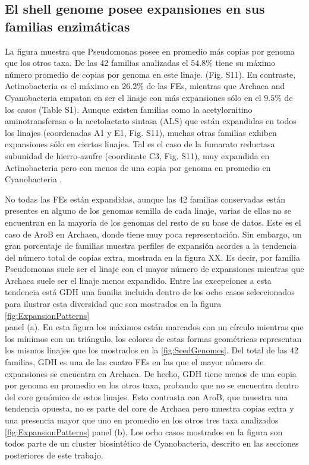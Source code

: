 \documentclass[12pt,twoside]{reedthesis}
\begin{document}
  \subsection{El shell genome posee expansiones en sus familias
  enzimáticas}\label{el-shell-genome-posee-expansiones-en-sus-familias-enzimaticas}
  
  La figura muestra que Pseudomonas posee en promedio más copias por
  genoma que los otros taxa. De las 42 familias analizadas el \(54.8\%\)
  tiene su máximo número promedio de copias por genoma en este linaje.
  (Fig. S11). En contraste, Actinobacteria es el máximo en \(26.2\%\) de
  las FEs, mientras que Archaea and Cyanobacteria empatan en ser el linaje
  con más expansiones sólo en el \(9.5\%\) de los casos (Table S1). Aunque
  existen familias como la acetylornitino aminotransferasa o la
  acetolactato sintasa (ALS) que están expandidas en todos los linajes
  (coordenadas A1 y E1, Fig. S11), muchas otras familias exhiben
  expansiones sólo en ciertos linajes. Tal es el caso de la fumarato
  reductasa subunidad de hierro-azufre (coordinate C3, Fig. S11), muy
  expandida en Actinobacteria pero con menos de una copia por genoma en
  promedio en Cyanobacteria .
  
  No todas las FEs están expandidas, aunque las 42 familias conservadas
  están presentes en alguno de los genomas semilla de cada linaje, varias
  de ellas no se encuentran en la mayoría de los genomas del resto de su
  base de datos. Este es el caso de AroB en Archaea, donde tiene muy poca
  representación. Sin embargo, un gran porcentaje de familias muestra
  perfiles de expansión acordes a la tendencia del número total de copias
  extra, mostrada en la figura XX. Es decir, por familia Pseudomonas suele
  ser el linaje con el mayor número de expansiones mientras que Archaea
  suele ser el linaje menos expandido. Entre las excepciones a esta
  tendencia está GDH una familia incluida dentro de los ocho casos
  seleccionados para ilustrar esta diversidad que son mostrados en la
  figura \autoref{fig:ExpansionPatterns}\\
  panel (a). En esta figura los máximos están marcados con un círculo
  mientras que los mínimos con un triángulo, los colores de estas formas
  geométricas representan los mismos linajes que los mostrados en la
  \autoref{fig:SeedGenomes}. Del total de las 42 familias, GDH es una de
  las cuatro FEs en las que el mayor número de expansiones se encuentra en
  Archaea. De hecho, GDH tiene menos de una copia por genoma en promedio
  en los otros taxa, probando que no se encuentra dentro del core genómico
  de estos linajes. Esto contrasta con AroB, que muestra una tendencia
  opuesta, no es parte del core de Archaea pero muestra copias extra y una
  presencia mayor que uno en promedio en los otros tres taxa analizados
  \autoref{fig:ExpansionPatterns} panel (b). Los ocho casos mostrados en
  la figura son todos parte de un cluster biosintético de Cyanobacteria,
  descrito en las secciones posteriores de este trabajo.
  
\end{document}
